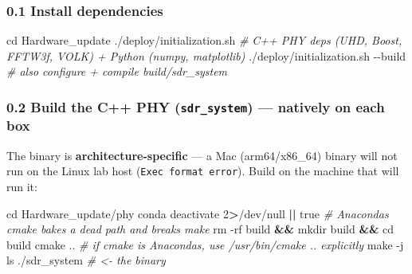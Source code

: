 \documentclass[
  9.5pt,
]{article}
\newenvironment{Shaded}{\begin{snugshade}}{\end{snugshade}}
\newcommand{\AttributeTok}[1]{\textcolor[rgb]{0.77,0.63,0.00}{#1}}
\newcommand{\BuiltInTok}[1]{#1}
\newcommand{\CommentTok}[1]{\textcolor[rgb]{0.56,0.35,0.01}{\textit{#1}}}
\newcommand{\DecValTok}[1]{\textcolor[rgb]{0.00,0.00,0.81}{#1}}
\newcommand{\ExtensionTok}[1]{#1}
\newcommand{\FunctionTok}[1]{\textcolor[rgb]{0.00,0.00,0.00}{#1}}
\newcommand{\KeywordTok}[1]{\textcolor[rgb]{0.13,0.29,0.53}{\textbf{#1}}}
\newcommand{\NormalTok}[1]{#1}
\newcommand{\OperatorTok}[1]{\textcolor[rgb]{0.81,0.36,0.00}{\textbf{#1}}}
\begin{document}
\hypertarget{01-install-dependencies}{%
\subsubsection{0.1 Install dependencies}\label{01-install-dependencies}}

\begin{Shaded}
\begin{Highlighting}[]
\BuiltInTok{cd}\NormalTok{ Hardware\_update}
\ExtensionTok{./deploy/initialization.sh}            \CommentTok{\# C++ PHY deps (UHD, Boost, FFTW3f, VOLK) + Python (numpy, matplotlib)}
\ExtensionTok{./deploy/initialization.sh} \AttributeTok{{-}{-}build}    \CommentTok{\# also configure + compile build/sdr\_system}
\end{Highlighting}
\end{Shaded}

\hypertarget{02-build-the-c-phy-sdr_system--natively-on-each-box}{%
\subsubsection{\texorpdfstring{0.2 Build the C++ PHY
(\texttt{sdr\_system}) --- natively on each
box}{0.2 Build the C++ PHY (sdr\_system) --- natively on each box}}\label{02-build-the-c-phy-sdr_system--natively-on-each-box}}

The binary is \textbf{architecture-specific} --- a Mac (arm64/x86\_64)
binary will not run on the Linux lab host
(\texttt{Exec\ format\ error}). Build on the machine that will run it:

\begin{Shaded}
\begin{Highlighting}[]
\BuiltInTok{cd}\NormalTok{ Hardware\_update/phy}
\ExtensionTok{conda}\NormalTok{ deactivate }\DecValTok{2}\OperatorTok{\textgreater{}}\NormalTok{/dev/null }\KeywordTok{||} \FunctionTok{true}      \CommentTok{\# Anaconda\textquotesingle{}s cmake bakes a dead path and breaks \textasciigrave{}make\textasciigrave{}}
\FunctionTok{rm} \AttributeTok{{-}rf}\NormalTok{ build }\KeywordTok{\&\&} \FunctionTok{mkdir}\NormalTok{ build }\KeywordTok{\&\&} \BuiltInTok{cd}\NormalTok{ build}
\FunctionTok{cmake}\NormalTok{ ..            }\CommentTok{\# if \textasciigrave{}cmake\textasciigrave{} is Anaconda\textquotesingle{}s, use /usr/bin/cmake .. explicitly}
\FunctionTok{make} \AttributeTok{{-}j}
\FunctionTok{ls}\NormalTok{ ./sdr\_system     }\CommentTok{\# \textless{}{-} the binary}
\end{Highlighting}
\end{Shaded}
\end{document}
